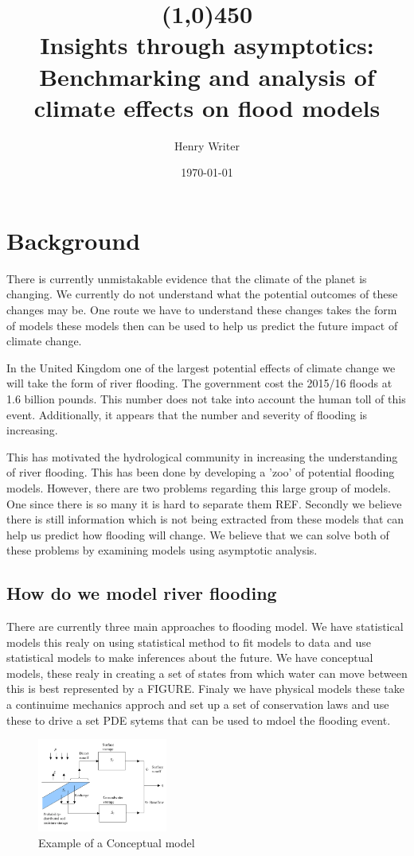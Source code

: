 \documentclass[11pt]{article}
\title{\line(1,0){450} \\ \Huge\textbf{Insights through asymptotics:}\\
 \LARGE Benchmarking and analysis of climate effects on flood models}
\author{Henry Writer }
\date{\today}
\begin{document}
\maketitle

\section{Background}

There is currently unmistakable evidence that the climate of the planet is changing. We currently do not understand what the potential outcomes of these changes may be. One route we have to understand these changes takes the form of models these models then can be used to help us predict the future impact of climate change.

In the United Kingdom one of the largest potential effects of climate change we will take the form of river flooding. The government cost the 2015/16 floods at 1.6 billion pounds. This number does not take into account the human toll of this event. Additionally, it appears that the number and severity of flooding is increasing. 


This has motivated the hydrological community in increasing the understanding of river flooding. This has been done by developing a 'zoo' of potential flooding models. However, there are two problems regarding this large group of models. One since there is so many it is hard to separate them REF. 
Secondly we believe there is still information which is not being extracted from these models that can help us predict how flooding will change. We believe that we can solve both of these problems by examining models using asymptotic analysis.

\subsection{How do we model river flooding}
There are currently three main approaches to flooding model. We have statistical models this realy on using statistical method to fit models to data and use statistical models to make inferences about the future. 
We have conceptual models, these realy in creating a set of states from which water can move between this is best represented by a FIGURE. 
Finaly we have physical models these take a continuime mechanics approch and set up a set of conservation laws and use these to drive a set PDE sytems that can be used to mdoel the flooding event.

\begin{figure}[H]
    \centering
    \includegraphics[width=0.38\textwidth]{Figs/Concept.png}
    \caption{Example of a Conceptual model}
    \label{fig:conceptual}
\end{figure}
\end{document}
